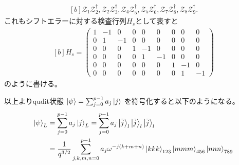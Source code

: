\documentclass[../master.tex]{subfiles}
\begin{document}
\begin{equation}\begin{aligned}[b]
    \mathcal{Z}_1\mathcal{Z}_2^\dagger, \mathcal{Z}_2\mathcal{Z}_3^\dagger,
    \mathcal{Z}_4\mathcal{Z}_5^\dagger, \mathcal{Z}_5\mathcal{Z}_6^\dagger,
    \mathcal{Z}_7\mathcal{Z}_8^\dagger, \mathcal{Z}_8\mathcal{Z}_9^\dagger.
\end{aligned}\end{equation}
これもシフトエラーに対する検査行列$H_s$として表すと
\begin{equation}\begin{aligned}[b]
    H_s = \begin{pmatrix}
        1 & -1 & 0 & 0 & 0 & 0 & 0 & 0 & 0\\
        0 & 1 & -1 & 0 & 0 & 0 & 0 & 0 & 0\\
        0 & 0 & 0 & 1 & -1 & 0 & 0 & 0 & 0\\
        0 & 0 & 0 & 0 & 1 & -1 & 0 & 0 & 0\\
        0 & 0 & 0 & 0 & 0 & 0&1&-1&0\\
        0&0&0&0&0&0&0&1&-1
    \end{pmatrix}
    \label{eq:chap2_H_shift}
\end{aligned}\end{equation}
のように書ける。

以上よりqudit状態 $\ket{\psi} = \sum_{j=0}^{p-1} a_j \ket{j}$ を符号化すると以下のようになる。
\begin{equation}\begin{aligned}[b]
    \ket{\psi}_L &= \sum_{j=0}^{p-1} a_j \ket{j}_L
    = \sum_{j=0}^{p-1} a_j \ket{\tilde{j}}_l \ket{\tilde{j}}_l \ket{\tilde{j}}_l\\
    &= \frac{1}{q^{3/2}}\sum_{j,k,m,n=0}^{p-1} a_j \omega^{-j(k+m+n)}\ket{kkk}_{123}\ket{mmm}_{456}\ket{nnn}_{789}
\end{aligned}\end{equation}
\end{document}
